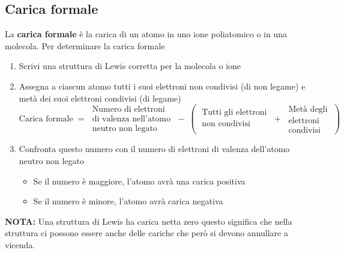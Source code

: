 \subsection{Carica formale}
La \textbf{carica formale} è la carica di un atomo in uno ione poliatomico o in una molecola.
Per determinare la carica formale
\begin{enumerate}
	\item Scrivi una struttura di Lewis corretta per la molecola o ione
	\item Assegna a ciascun atomo tutti i suoi elettroni non condivisi (di non legame) e metà dei suoi elettroni condivisi (di legame)
	      \begin{equation*}
		      \text{Carica formale} \;=\;
		      \begin{matrix}
			      \text{Numero di elettroni}   \\
			      \text{di valenza nell'atomo} \\
			      \text{neutro non legato}
		      \end{matrix}
		      \;-\; \left(\;
		      \begin{matrix}
				      \text{Tutti gli elettroni} \\
				      \text{non condivisi}       \\
			      \end{matrix}
		      \;+\;
		      \begin{matrix}
				      \text{Metà degli} \\
				      \text{elettroni}  \\
				      \text{condivisi}
			      \end{matrix}\;
		      \right)
	      \end{equation*}
	\item Confronta questo numero con il numero di elettroni di valenza dell'atomo neutro non legato
	      \begin{itemize}
		      \item Se il numero è maggiore, l'atomo avrà una carica positiva
		      \item Se il numero è minore, l'atomo avrà carica negativa
	      \end{itemize}
\end{enumerate}

\begin{framed}
	\noindent\textbf{NOTA:}
	Una struttura di Lewis ha carica netta zero questo significa che nella struttura ci possono essere anche delle cariche che però si devono annullare a vicenda.
\end{framed}
